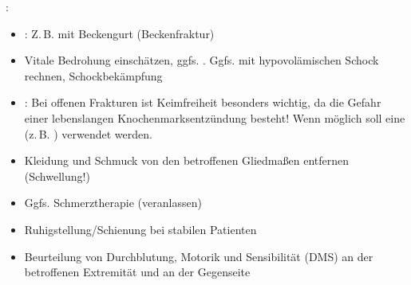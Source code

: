 \label{m:fraktur}
: 




\begin{itemize}
  \item  {}: Z.\,B. mit Beckengurt
  (Beckenfraktur)
  \item Vitale Bedrohung einschätzen, ggfs. \TxMassVitMK.
  Ggfs. mit hypovolämischen Schock rechnen, Schockbekämpfung
  \item  {}: Bei offenen Frakturen ist
  Keimfreiheit be\-sonders wichtig, da  die Gefahr einer lebenslangen
  Knochen\-marks\-ent\-zündung  besteht!
  Wenn möglich soll eine  (z.\,B.
  \texttrademark ) verwendet werden.
  \item Kleidung und Schmuck von den betroffenen Gliedmaßen
  entfernen (Schwellung!)
  \item Ggfs. Schmerztherapie (veranlassen)
  \item Ruhigstellung/Schienung bei stabilen Patienten
  \item Beurteilung von Durchblutung, Motorik und
  Sensibilität (DMS) an der betroffenen Extremität und an
  der Gegenseite
\end{itemize}
